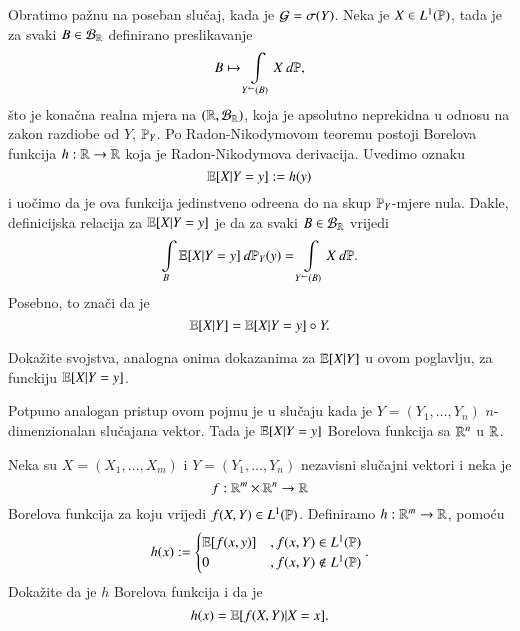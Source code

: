 Obratimo pa\v znu na poseban slu\v caj, kada je $\mathcal{G} = \sigma({Y})$.
Neka je $X \in L^1 (\mathbb{P})$, tada je za svaki $B \in \mathcal{B}_{\mathbb{R}}$ definirano preslikavanje
\begin{equation*}
    B \mapsto \int\limits_{{Y}^{\leftarrow} (B)} X \: d \mathbb{P},
\end{equation*}
\v sto je kona\v cna realna mjera na $(\mathbb{R}, \mathcal{B}_{\mathbb{R}})$, koja je apsolutno neprekidna u odnosu na zakon razdiobe od $Y$, $\mathbb{P}_Y$.
Po Radon-Nikodymovom teoremu postoji Borelova funkcija $h : \mathbb{R} \to \mathbb{R}$ koja je Radon-Nikodymova derivacija.
Uvedimo oznaku
\begin{equation}    \label{jed:22.19}
    \mathbb{E} [X | Y = y] := h (y)
\end{equation}
i uo\v cimo da je ova funkcija jedinstveno odre\dj ena do na skup $\mathbb{P}_Y$-mjere nula.
Dakle, definicijska relacija za $\mathbb{E} [X | Y = y]$ je da za svaki $B \in \mathcal{B}_{\mathbb{R}}$ vrijedi
\begin{equation}    \label{jed:22.20}
    \int\limits_B \mathbb{E} [X | Y = y] \: d \mathbb{P}_Y (y) = \int\limits_{{Y}^{\leftarrow} (B)} X \: d \mathbb{P}.
\end{equation}
Posebno, to zna\v ci da je
\begin{equation}    \label{jed:22.21}
    \mathbb{E} [X | Y] = \mathbb{E} [X | Y = y] \circ Y.
\end{equation}

\begin{zad} \label{zad:22.22}
    Doka\v zite svojstva, analogna onima dokazanima za $\mathbb{E} [X | Y]$ u ovom poglavlju, za funckiju $\mathbb{E} [X | Y = y]$.
\end{zad}

\begin{nap} \label{nap:22.23}
    Potpuno analogan pristup ovom pojmu je u slu\v caju kada je $Y = (Y_1, \ldots, Y_n)$ $n$-dimenzionalan slu\v cajana vektor.
    Tada je $\mathbb{E} [X | Y = y]$ Borelova funkcija sa $\mathbb{R}^n$ u $\mathbb{R}$.
\end{nap}

\begin{zad} \label{zad:22.24}
    Neka su $X = (X_1, \ldots, X_m)$ i $Y = (Y_1, \ldots, Y_n)$ nezavisni slu\v cajni vektori i neka je
    \begin{equation*}
        f : \mathbb{R}^m \times \mathbb{R}^n \to \mathbb{R}
    \end{equation*}
    Borelova funkcija za koju vrijedi $f (X, Y) \in L^1 (\mathbb{P})$.
    Definiramo $h: \mathbb{R}^m \to \mathbb{R}$, pomo\' cu
    \begin{equation*}
        h (x) :=
        \begin{cases}
            \mathbb{E} [ f (x, y)] &, f (x, Y) \in L^1 (\mathbb{P})\\
            0 &, f (x, Y) \notin L^1 (\mathbb{P})
        \end{cases}.
    \end{equation*}
    Doka\v zite da  je $h$ Borelova funkcija i da je
    \begin{equation*}
        h (x) = \mathbb{E} [f (X, Y) | X = x].
    \end{equation*}
\end{zad}

